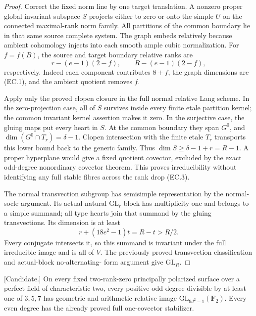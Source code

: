 \begin{proof}
Correct the fixed norm line by one target translation. A nonzero
proper global invariant subspace $S$ projects either to zero or
onto the simple $U$ on the connected maximal-rank norm family.
All partitions of the common boundary lie in that same source
complete system. The graph embeds relatively because ambient
cohomology injects into each smooth ample cubic normalization.
For $f=f(B)$, the source and target boundary relative ranks are
\[
 r-(e-1)(2-f),\qquad R-(e-1)(2-f),                              \tag{EC.3}
\]
respectively. Indeed each component contributes $8+f$, the graph
dimensions are (EC.1), and the ambient quotient removes $f$.

Apply only the proved clopen closure in the full normal relative
Lang scheme. In the zero-projection case, all of $S$ survives
inside every finite etale partition kernel; the common invariant
kernel assertion makes it zero. In the surjective case, the
gluing maps put every heart in $S$. At the common boundary they
span $G^0$, and $\dim(G^0\cap T_r)=\delta-1$.
Clopen intersection with the finite etale $T_r$ transports this
lower bound back to the generic family. Thus
$\dim S\ge\delta-1+r=R-1$. A proper hyperplane would give a
fixed quotient covector, excluded by the exact odd-degree
nonordinary covector theorem. This proves irreducibility without
identifying any full stable fibres across the rank drop (EC.3).

The normal transvection subgroup has semisimple representation
by the normal-socle argument. Its actual natural $\mathrm{GL}_r$
block has multiplicity one and belongs to a simple summand; all
type hearts join that summand by the gluing transvections.
Its dimension is at least
\[
                r+(18e^2-1)t=R-t>R/2.
\]
Every conjugate intersects it, so this summand is invariant under
the full irreducible image and is all of $V$. The previously
proved transvection classification and actual-block no-alternating-
form argument give $\mathrm{GL}_R$.
\end{proof}

\begin{corollary}
\label{cor:f0-odd-multiples-three-five-seven-candidate}
\textup{[Candidate.]}
On every fixed two-rank-zero principally polarized surface over
a perfect field of characteristic two, every positive odd degree
divisible by at least one of $3,5,7$ has geometric and arithmetic
relative image $\mathrm{GL}_{9d^2-1}(\mathbf F_2)$. Every even
degree has the already proved full one-covector stabilizer.
\end{corollary}

